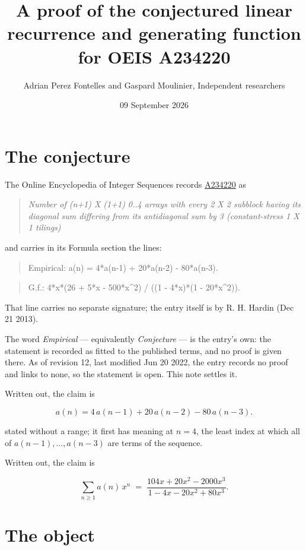 \documentclass[11pt]{article}
\title{A proof of the conjectured linear recurrence and generating function for OEIS A234220}
\author{Adrian Perez Fontelles and Gaspard Moulinier, Independent researchers}
\date{09 September 2026}
\theoremstyle{definition}
\begin{document}
\maketitle
\section{The conjecture}

The Online Encyclopedia of Integer Sequences records \href{https://oeis.org/A234220}{A234220} as

\begin{quote}\itshape Number of (n+1) X (1+1) 0..4 arrays with every 2 X 2 subblock having its diagonal sum differing from its antidiagonal sum by 3 (constant-stress 1 X 1 tilings)\end{quote}

and carries in its Formula section the lines:

\begin{quote}\ttfamily Empirical: a(n) = 4*a(n-1) + 20*a(n-2) - 80*a(n-3).\end{quote}

\begin{quote}\ttfamily G.f.: 4*x*(26 + 5*x - 500*x\textasciicircum{}2) / ((1 - 4*x)*(1 - 20*x\textasciicircum{}2)).\end{quote}

That line carries no separate signature; the entry itself is by R. H. Hardin (Dec 21 2013).

The word {\itshape Empirical} --- equivalently {\itshape Conjecture} --- is the entry's own: the statement is recorded as fitted to the published terms, and no proof is given there. As of revision 12, last modified Jun 20 2022, the entry records no proof and links to none, so the statement is open. This note settles it.

Written out, the claim is

\[a(n) = 4\,a(n-1) + 20\,a(n-2) - 80\,a(n-3).\]

stated without a range; it first has meaning at $n = 4$, the least index at which all of $a(n-1),\dots,a(n-3)$ are terms of the sequence.

Written out, the claim is

\[\sum_{n \ge 1} a(n)\,x^n \;=\; \frac{104x + 20x^{2} - 2000x^{3}}{1 - 4x - 20x^{2} + 80x^{3}}.\]

\section{The object}
\end{document}
